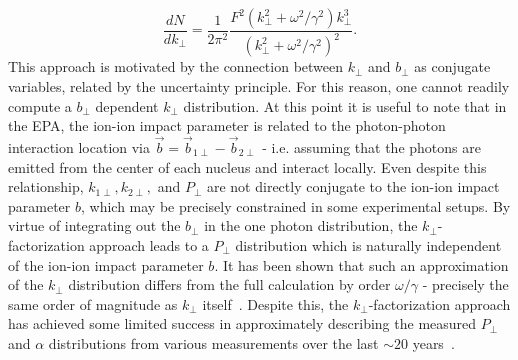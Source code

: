 \documentclass[twocolumn,epjc3]{svjour3}\sloppy
\begin{document}
\begin{equation}
    \frac{dN}{dk_\perp} = \frac{1}{2\pi^2} \frac{F^2(k_\perp^2 + \omega^2/\gamma^2) k_\perp^3}{(k_\perp^2 + \omega^2/\gamma^2)^2}.
    \label{eq:ktfactorization}
\end{equation}
This approach is motivated by the connection between $k_\perp$ and $b_\perp$ as conjugate variables, related by the uncertainty principle\cite{heisenbergUeberAnschaulichenInhalt1927}. For this reason, one cannot readily compute a $b_\perp$ dependent $k_\perp$ distribution. 
At this point it is useful to note that in the EPA, the ion-ion impact parameter is related to the photon-photon interaction location via $\vec{b} = \vec{b}_{1\perp} - \vec{b}_{2\perp}$ - i.e. assuming that the photons are emitted from the center of each nucleus and interact locally.
Even despite this relationship, $k_{1\perp}, k_{2\perp},$ and $P_\perp$ are not directly conjugate to the ion-ion impact parameter $b$, which may be precisely constrained in some experimental setups. 
By virtue of integrating out the $b_{\perp}$ in the one photon distribution, the $k_\perp$-factorization approach leads to a $P_\perp$ distribution which is naturally independent of the ion-ion impact parameter $b$.
It has been shown that such an approximation of the $k_\perp$ distribution differs from the full calculation by order $\omega/\gamma$ - precisely the same order of magnitude as $k_\perp$ itself~\cite{PhysRevC.47.2308,henckenImpactparameterDependenceTotal1995}.
Despite this, the $k_\perp$-factorization approach has achieved some limited success in approximately describing the measured $P_\perp$ and $\alpha$ distributions from various measurements over the last $\sim20$ years~\cite{starcollaborationProductionEnsuremathPairs2004,atlas_collaboration_evidence_2017,atlas_collaboration_observation_2019,atlascollaborationExclusiveDimuonProduction2020,abbasCharmoniumPairPhotoproduction2013a,alicecollaborationMeasurementExcessYield2016b}. 
\end{document}
